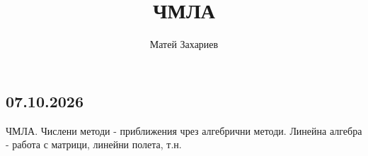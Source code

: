 \documentclass[12pt, a4paper]{article}
\title{ЧМЛА}
\author{Матей Захариев}
\date{}
\begin{document}
\maketitle
\begin{center}\section*{07.10.2026}\end{center}
ЧМЛА. Числени методи - приближения чрез алгебрични методи. Линейна алгебра - работа с матрици, линейни полета, т.н.
\end{document}
